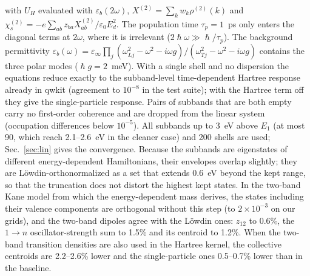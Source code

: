 \documentclass[11pt]{article}
\begin{document}
with $U_H$ evaluated with $\varepsilon_b(2\omega)$, $X^{(2)}=\sum_kw_k\rho^{(2)}(k)$ and $\chi^{(2)}_s=-e\sum_{ab}z_{ba}X^{(2)}_{ab}/\varepsilon_0E_d^2$. The population time $\tau_p=1$~ps only enters the diagonal terms at $2\omega$, where it is irrelevant ($2\hslash\omega\gg\hslash/\tau_p$). The background permittivity $\varepsilon_b(\omega)=\varepsilon_\infty\prod_j(\omega_{Lj}^2-\omega^2-i\omega g)/(\omega_{Tj}^2-\omega^2-i\omega g)$ contains the three polar modes ($\hslash g=2$~meV). With a single shell and no dispersion the equations reduce exactly to the subband-level time-dependent Hartree response \cite{AllenTsuiVinter1976,Ando1977,AndoRMP1982} already in qwkit (agreement to $10^{-8}$ in the test suite); with the Hartree term off they give the single-particle response. Pairs of subbands that are both empty carry no first-order coherence and are dropped from the linear system (occupation differences below $10^{-5}$). All subbands up to 3~eV above $E_1$ (at most 90, which reach 2.1--2.6~eV in the cleaner case) and 200 shells are used; Sec.~\ref{sec:lin} gives the convergence. Because the subbands are eigenstates of different energy-dependent Hamiltonians, their envelopes overlap slightly; they are L\"owdin-orthonormalized as a set that extends 0.6~eV beyond the kept range, so that the truncation does not distort the highest kept states. In the two-band Kane model from which the energy-dependent mass derives, the states including their valence components are orthogonal without this step (to $2\times10^{-3}$ on our grids), and the two-band dipoles agree with the L\"owdin ones: $z_{12}$ to 0.6\%, the $1\to n$ oscillator-strength sum to 1.5\% and its centroid to 1.2\%. When the two-band transition densities are also used in the Hartree kernel, the collective centroids are 2.2--2.6\% lower and the single-particle ones 0.5--0.7\% lower than in the baseline.
\end{document}
